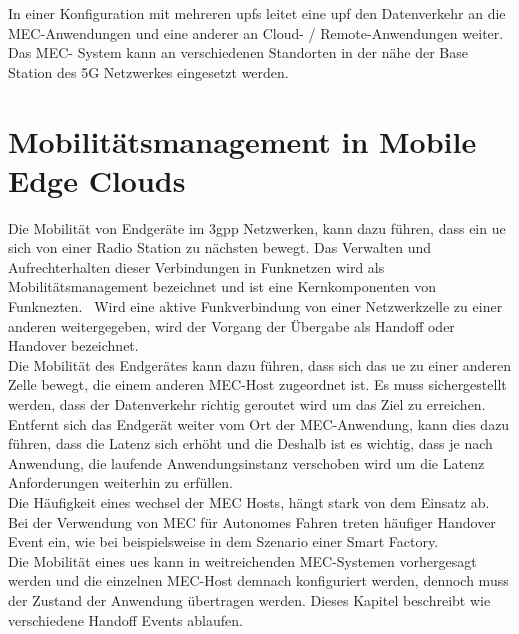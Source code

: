 \documentclass[runningheads]{llncs}
\numberwithin{figure}{section}
\begin{document}
In einer Konfiguration mit mehreren \acrfull{upf}s leitet eine \acrfull{upf} den Datenverkehr an die MEC-Anwendungen und 
eine anderer an Cloud- / Remote-Anwendungen weiter.
Das MEC- System kann an verschiedenen Standorten in der nähe der Base Station des 5G Netzwerkes eingesetzt werden. 

\newpage

\section{Mobilitätsmanagement in Mobile Edge Clouds}
\label{sec:Mobilitätsmanagement}
Die Mobilität von Endgeräte im \acrshort{3gpp} Netzwerken, kann dazu führen, dass ein \acrshort{ue} sich von einer 
Radio Station zu nächsten bewegt. Das Verwalten und Aufrechterhalten dieser Verbindungen in Funknetzen wird
als Mobilitätsmanagement bezeichnet und ist eine Kernkomponenten von Funknezten. 
Wird eine aktive Funkverbindung von einer Netzwerkzelle zu einer anderen weitergegeben, wird der Vorgang
der Übergabe als Handoff oder Handover bezeichnet.\\
Die Mobilität des Endgerätes kann dazu führen, 
dass sich das \acrshort{ue} zu einer anderen Zelle bewegt, 
die einem anderen MEC-Host zugeordnet ist. Es muss sichergestellt werden, dass der Datenverkehr
richtig geroutet wird um das Ziel zu erreichen.
Entfernt sich das Endgerät weiter vom Ort der MEC-Anwendung, 
kann dies dazu führen, dass die Latenz sich erhöht und die Deshalb ist es wichtig, dass je nach Anwendung,
die laufende Anwendungsinstanz verschoben wird um die Latenz Anforderungen weiterhin zu erfüllen. \\
Die Häufigkeit eines wechsel der MEC Hosts, hängt stark von dem 
Einsatz ab. Bei der Verwendung von MEC für Autonomes Fahren treten häufiger Handover Event ein, wie bei
beispielsweise in dem Szenario einer Smart Factory.\\
Die Mobilität eines \acrshort{ue}s kann in weitreichenden MEC-Systemen vorhergesagt werden und die einzelnen MEC-Host demnach konfiguriert werden,
dennoch muss der Zustand der Anwendung übertragen werden.
Dieses Kapitel beschreibt wie verschiedene Handoff Events ablaufen. \cite{etsiMultiaccessEdgeComputinga}
\end{document}
